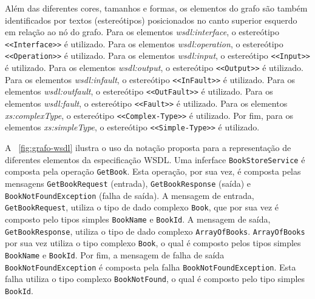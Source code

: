 Além das diferentes cores, tamanhos e formas, os elementos do grafo são também identificados por textos (estereótipos) posicionados no canto superior esquerdo em relação ao nó do grafo. Para os elementos \textit{wsdl:interface}, o estereótipo \texttt{<<Interface>>} é utilizado. Para os elementos \textit{wsdl:operation}, o estereótipo \texttt{<<Operation>>} é utilizado. Para os elementos \textit{wsdl:input}, o estereótipo \texttt{<<Input>>} é utilizado. Para os elementos \textit{wsdl:output}, o estereótipo \texttt{<<Output>>} é utilizado. Para os elementos \textit{wsdl:infault}, o estereótipo \texttt{<<InFault>>} é utilizado. Para os elementos \textit{wsdl:outfault}, o estereótipo \texttt{<<OutFault>>} é utilizado. Para os elementos \textit{wsdl:fault}, o estereótipo \texttt{<<Fault>>} é utilizado. Para os elementos \textit{xs:complexType}, o estereótipo \texttt{<<Complex-Type>>} é utilizado. Por fim, para os elementos \textit{xs:simpleType}, o estereótipo \texttt{<<Simple-Type>>} é utilizado.

A \figurename~\ref{fig:grafo-wsdl} ilustra o uso da notação proposta para a representação de diferentes elementos da especificação WSDL. Uma inferface \texttt{BookStoreService} é composta pela operação \texttt{GetBook}. Esta operação, por sua vez, é composta pelas mensagens \texttt{GetBookRequest} (entrada), \texttt{GetBookResponse} (saída) e \texttt{BookNotFoundException} (falha de saída). A mensagem de entrada, \texttt{GetBookRequest}, utiliza o tipo de dado complexo \texttt{Book}, que por sua vez é composto pelo tipos simples \texttt{BookName} e \texttt{BookId}. A mensagem de saída, \texttt{GetBookResponse}, utiliza o tipo de dado complexo \texttt{ArrayOfBooks}.  \texttt{ArrayOfBooks} por sua vez utiliza o tipo complexo \texttt{Book}, o qual é composto pelos  tipos simples \texttt{BookName} e \texttt{BookId}. Por fim, a mensagem de falha de saída \texttt{BookNotFoundException} é composta pela falha \texttt{BookNotFoundException}. Esta falha utiliza o tipo complexo \texttt{BookNotFound}, o qual é composto pelo tipo simples \texttt{BookId}.

